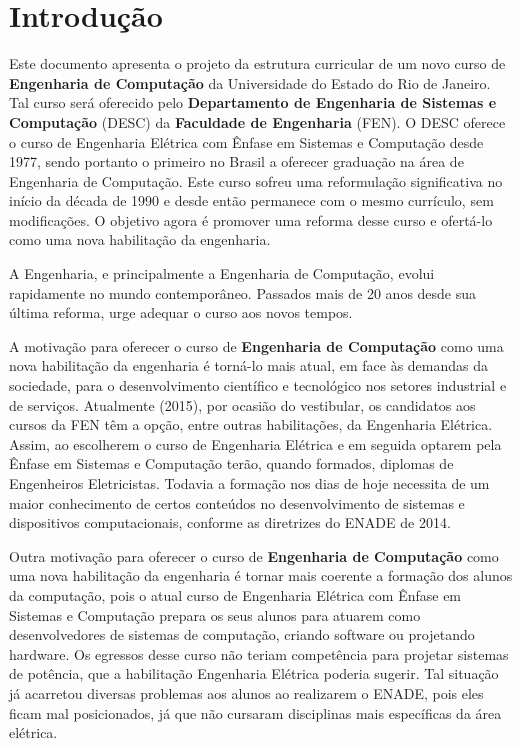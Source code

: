 %
%
%


\chapter{Introdução}
\label{intro} %

Este documento apresenta o projeto da estrutura curricular de um novo curso de \textbf{Engenharia de Computação} da Universidade do Estado do Rio de Janeiro. Tal curso será oferecido pelo \textbf{Departamento de Engenharia de Sistemas e Computação} (DESC) da \textbf{Faculdade de Engenharia} (FEN). O DESC oferece o curso de Engenharia Elétrica com Ênfase em Sistemas e Computação desde 1977, sendo portanto o primeiro no Brasil a oferecer graduação na área de Engenharia de Computação. Este curso sofreu uma reformulação significativa no início da década de 1990 e desde então permanece com o mesmo currículo, sem modificações. O objetivo agora é promover uma reforma desse curso e ofertá-lo como uma nova habilitação da engenharia.

A Engenharia, e principalmente a Engenharia de Computação, evolui rapidamente no mundo contemporâneo. Passados mais de 20 anos desde sua última reforma, urge adequar o curso aos novos tempos.

A motivação para oferecer o curso de \textbf{Engenharia de Computação} como uma nova habilitação da engenharia é torná-lo mais atual, em face às demandas da sociedade, para o desenvolvimento científico e tecnológico nos setores industrial e de serviços. Atualmente (2015), por ocasião do vestibular, os candidatos aos cursos da FEN têm a opção, entre outras habilitações, da Engenharia Elétrica. Assim, ao escolherem o curso de Engenharia Elétrica e em seguida optarem pela Ênfase em Sistemas e Computação terão, quando formados, diplomas de Engenheiros Eletricistas. Todavia a formação nos dias de hoje necessita de um maior conhecimento de certos conteúdos no desenvolvimento de sistemas e dispositivos computacionais, conforme as diretrizes do ENADE de 2014.

Outra motivação para oferecer o curso de \textbf{Engenharia de Computação} como uma nova habilitação da engenharia é tornar mais coerente a formação dos alunos da computação, pois o atual curso de Engenharia Elétrica com Ênfase em Sistemas e Computação prepara os seus alunos para atuarem como desenvolvedores  de sistemas de computação, criando software ou projetando hardware. Os egressos desse curso não teriam competência para projetar sistemas de potência, que a habilitação Engenharia Elétrica poderia sugerir. Tal situação já acarretou diversas problemas aos alunos ao realizarem o ENADE, pois eles ficam mal posicionados, já que não cursaram disciplinas mais específicas da área elétrica.

